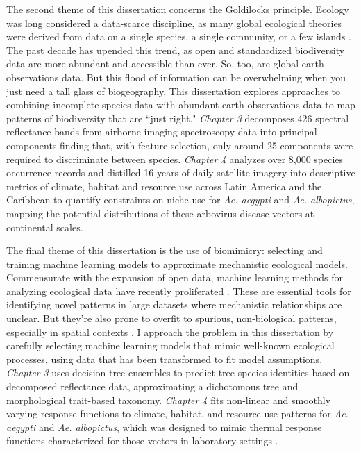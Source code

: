 The second theme of this dissertation concerns the Goldilocks principle. Ecology was long considered a data-scarce discipline, as many global ecological theories were derived from data on a single species, a single community, or a few islands \cite{Grinnell1917-aa, Hubbell2001-lq, MacArthur1967-zp}. The past decade has upended this trend, as open and standardized biodiversity data are more abundant and accessible than ever. So, too, are global earth observations data. But this flood of information can be overwhelming when you just need a tall glass of biogeography. This dissertation explores approaches to combining incomplete species data with abundant earth observations data to map patterns of biodiversity that are ``just right." \textit{Chapter 3} decomposes 426 spectral reflectance bands from airborne imaging spectroscopy data into principal components finding that, with feature selection, only around 25 components were required to discriminate between species. \textit{Chapter 4} analyzes over 8,000 species occurrence records and distilled 16 years of daily satellite imagery into descriptive metrics of climate, habitat and resource use across Latin America and the Caribbean to quantify constraints on niche use for \textit{Ae. aegypti} and \textit{Ae. albopictus}, mapping the potential distributions of these arbovirus disease vectors at continental scales.

The final theme of this dissertation is the use of biomimicry: selecting and training machine learning models to approximate mechanistic ecological models. Commensurate with the expansion of open data, machine learning methods for analyzing ecological data have recently proliferated \cite{Pal2005-qh, Phillips2006-ua, Hastie2009-fs, Elith2011-kb, Brodrick2019-jz}. These are essential tools for identifying novel patterns in large datasets where mechanistic relationships are unclear. But they're also prone to overfit to spurious, non-biological patterns, especially in spatial contexts \cite{Hawkins2012-gu, Fourcade2018-ws}. I approach the problem in this dissertation by carefully selecting machine learning models that mimic well-known ecological processes, using data that has been transformed to fit model assumptions. \textit{Chapter 3} uses decision tree ensembles to predict tree species identities based on decomposed reflectance data, approximating a dichotomous tree and morphological trait-based taxonomy. \textit{Chapter 4} fits non-linear and smoothly varying response functions to climate, habitat, and resource use patterns for \textit{Ae. aegypti} and \textit{Ae. albopictus}, which was designed to mimic thermal response functions characterized for those vectors in laboratory settings \cite{Mordecai2019-ya}.


